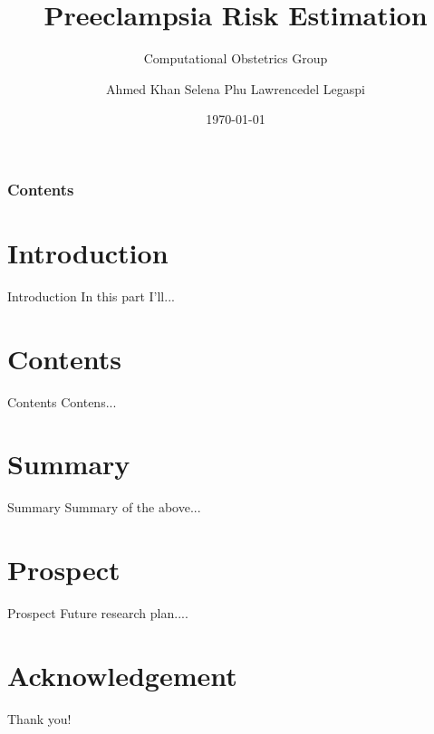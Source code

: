 \documentclass[10pt]{beamer}
\title[Preeclampsia Risk Estimation]{Preeclampsia Risk Estimation}%
\subtitle{Computational Obstetrics Group}%
\author[Computational Obstetrics Group]{Ahmed Khan \hspace{1.2em} Selena Phu \hspace{1.2em} Lawrencedel Legaspi}%
\institute[UC Davis]{UC Davis}
\date[\textcolor{white}{\today} ]
{\today}
\begin{document}
\frame{\titlepage}
\begin{frame}
\frametitle{Contents}
\tableofcontents
\end{frame}
\section{Introduction}
    \begin{frame}{Introduction}
 In this part I'll...
    \end{frame}

\section{Contents}
\begin{frame}{Contents}
	Contens...
\end{frame}



\section{Summary}
    \begin{frame}{Summary}
 Summary of the above...
    \end{frame}


\section{Prospect}
\begin{frame}{Prospect}
	Future research plan....
\end{frame}

\section*{Acknowledgement}
\begin{frame}
\textcolor{myNewColorA}{\Huge{\centerline{Thank you!}}}
\end{frame}
\end{document}
